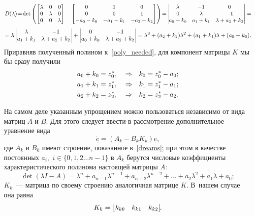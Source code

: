 \documentclass[12pt,a4paper,openany]{extarticle}
\begin{document}
\begin{equation}\notag
	D(\lambda)\!=\!
	\det\left(
	\begin{bmatrix}
		\lambda & 0 & 0\\
		0 & \lambda & 0\\
		0 & 0 & \lambda
	\end{bmatrix} - 
	\begin{bmatrix}
		0 & 1 & 0\\
		0 & 0 & 1\\
		-a_0-k_{0} & -a_1-k_{1} & -a_2-k_{2}
	\end{bmatrix}\right)
	\!=\!
	\begin{vmatrix}
		\lambda & -1 & 0\\
		0 & \lambda & -1\\
		a_0 + k_0 & a_1+k_1 & \lambda + a_2 + k_2
	\end{vmatrix}=
\end{equation}
\begin{equation}
	= \lambda
	\begin{vmatrix}
		\lambda & -1\\
		a_1+k_1 & \lambda + a_2 + k_2
	\end{vmatrix} +
	\begin{vmatrix}
		0 & -1\\
		a_0+k_0 & \lambda + a_2 + k_2
	\end{vmatrix}=
	\lambda^3+(a_2+k_2)\lambda^2 + (a_1+k_1)\lambda+ (a_0+k_0)\ldotp
\end{equation}
Приравняв полученный полином к~\eqref{poly_needed}, для компонент матрицы $K$ мы бы сразу получили
\begin{align}
	&a_0+k_0= z_0^*, && \Rightarrow && k_0=z_0^*-a_0;\label{k0}\\
	&a_1+k_1= z_1^*, && \Rightarrow && k_1=z_1^*-a_1;\\
	&a_2+k_2= z_2^*, && \Rightarrow && k_2=z_2^*-a_2\ldotp\label{k2}
\end{align}

На самом деле указанным упрощением можно пользоваться независимо от вида матриц $A$ и $B$.
Для этого следует ввести в рассмотрение дополнительное уравнение вида
\begin{equation}\label{trick_eq}
	\underline{\dot{e}} = (A_k-B_kK_k)\underline{e},
\end{equation}
где $A_k$ и $B_k$ имеют строение, показанное в~\eqref{dreams};
при этом в качестве постоянных $a_i,$ $i\in\{0,1,2\ldots n-1\}$ в $A_k$ берутся числовые коэффициенты характеристического полинома настоящей матрицы $A$:
\begin{equation}
	\det(\lambda I - A) = \lambda^n + a_{n-1}\lambda^{n-1} + a_{n-2}\lambda^{n-2} + \dots + a_2\lambda^2 + a_1\lambda + a_0;
\end{equation}
$K_k$~--- матрица по своему строению аналогичная матрице $K$.
В~нашем случае она равна
\begin{equation}
	K_k = 
	\begin{bmatrix}
		k_{k0} & k_{k1} & k_{k2}
	\end{bmatrix}\!\!\ldotp
\end{equation}
\end{document}
